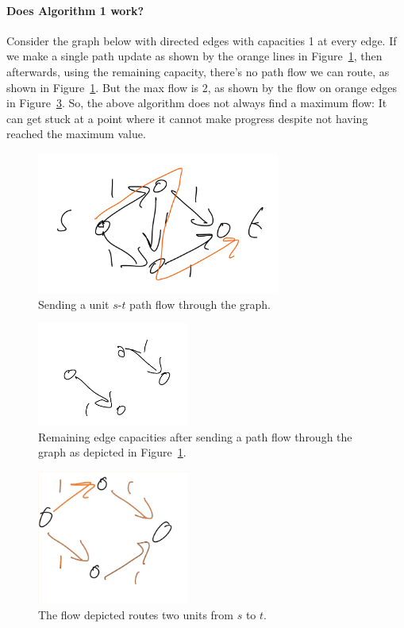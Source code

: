 \paragraph{Does Algorithm 1 work?}
Consider the graph below with directed edges with capacities 1 at
every edge.
If we make a single path update as shown by the orange lines in
Figure~\ref{fig:ex6}, then afterwards, using the remaining capacity,
there's no path flow we can route, as shown in Figure~\ref{fig:ex6}.
But the max flow is 2, as shown by the flow on orange edges in
Figure~\ref{fig:ex8}.
So, the above algorithm does not always find a maximum flow: It can
get stuck at a point where it cannot make progress despite not having
reached the maximum value.
\begin{figure}[H]
  \centering
  \includegraphics[width=80mm,scale=0.5]{fig/fig6_lec10.PNG}
  \caption{Sending a unit $s$-$t$ path flow through the graph.}
    \label{fig:ex6}
\end{figure}
\begin{figure}[H]
\centering
\includegraphics[width=50mm,scale=0.5]{fig/fig7_lec10.PNG}
  \caption{Remaining edge capacities after sending a path flow through
    the graph as depicted in Figure~\ref{fig:ex6}.}
  \label{fig:ex7}
\end{figure}
\begin{figure}[H]
 \centering
 \includegraphics[width=50mm,scale=0.5]{fig/fig8_lec10.PNG}
 \caption{The flow depicted routes two units from $s$ to $t$.}
  \label{fig:ex8}
\end{figure}

